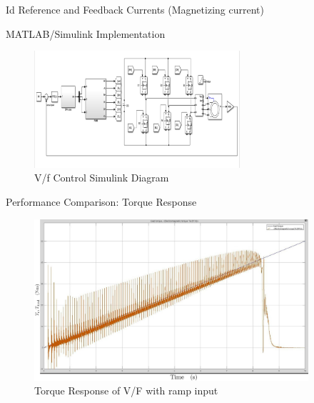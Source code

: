 \begin{frame}{Id Reference and Feedback Currents (Magnetizing current)}
	\begin{figure}
		\centering


	\end{figure}
\end{frame}



\begin{frame}{MATLAB/Simulink Implementation}
	\begin{figure}
		\includegraphics[width=3in]{conference/vfSimulation.png} %
		\caption{V/f Control Simulink Diagram}
	\end{figure}
\end{frame}


\begin{frame}{Performance Comparison: Torque Response}
	\begin{figure}
		\includegraphics[width=4in]{conference/60rpmTorque.jpeg} %
		\caption{Torque Response of V/F with ramp input}
	\end{figure}
\end{frame}

